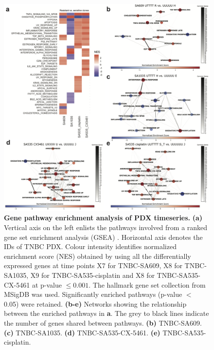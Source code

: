\begin{figure}
\centering
  \includegraphics[width=\textwidth]{Figures/chap5/pathwaysnetwork.png}
\caption[Gene pathway enrichment analysis of PDX timeseries]
	{\small
	\textbf{Gene pathway enrichment analysis of PDX timeseries.}
	 	\textbf{(a)} Vertical axis on the left enlists the pathways involved from a ranked gene set enrichment analysis (GSEA) \cite{shi2007gene}. Horizontal axis denotes the IDs of TNBC PDX. Colour intensity identifies normalized enrichment score (NES) obtained by using all the differentially expressed genes at time points X7 for TNBC-SA609, X8 for TNBC-SA1035, X9 for TNBC-SA535-cisplatin and X8 for TNBC-SA535-CX-5461 at p-value $\leq 0.001$. The hallmark gene set collection from MSigDB \cite{liberzon2015molecular} was used. Significantly enriched pathways (p-value $<$ 0.05) were retained.   \textbf{(b-e)} Networks showing the relationship between the enriched pathways in \textbf{a}. The grey to black lines indicate the number of genes shared between pathways. \textbf{(b)} TNBC-SA609. \textbf{(c)} TNBC-SA1035.  \textbf{(d)} TNBC-SA535-CX-5461. \textbf{(e)} TNBC-SA535-cisplatin.
	}
	\label{fig:pathwaysnetwork}
\end{figure}



